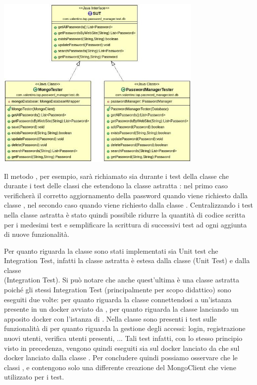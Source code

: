 	\begin{center}
		\includegraphics[width=10cm]{Immagini/SUT.jpg}
	\end{center}

Il metodo , per esempio, sarà richiamato sia durante i test della classe  che durante i test delle classi che estendono la classe astratta : nel primo caso verificherà il corretto aggiornamento della password quando viene richiesto dalla classe , nel secondo caso quando viene richiesto dalla classe . Centralizzando i test nella classe astratta è stato quindi possibile ridurre la quantità di codice scritta per i medesimi test e semplificare la scrittura di successivi test ad ogni aggiunta di nuove funzionalità.

Per quanto riguarda la classe  sono stati implementati sia Unit test che Integration Test, infatti la classe astratta  è estesa dalla classe  (Unit Test) e dalla classe \\  (Integration Test). Si può notare che anche quest'ultima è una classe astratta poiché gli stessi Integration Test (principalmente per scopo didattico) sono eseguiti due volte: per quanto riguarda la classe  connettendosi a un'istanza  presente in un docker avviato da , per quanto riguarda la classe  lanciando un apposito docker con l'istanza di . Nella classe  sono presenti i test sulle funzionalità di  per quanto riguarda la gestione degli accessi: login, registrazione nuovi utenti, verifica utenti presenti, ... Tali test infatti, con lo stesso principio visto in precedenza, vengono quindi eseguiti sia sul docker lanciato da  che sul docker lanciato dalla classe .
Per concludere quindi possiamo osservare che le classi ,  e  contengono solo una differente creazione del MongoClient che viene utilizzato per i test.

